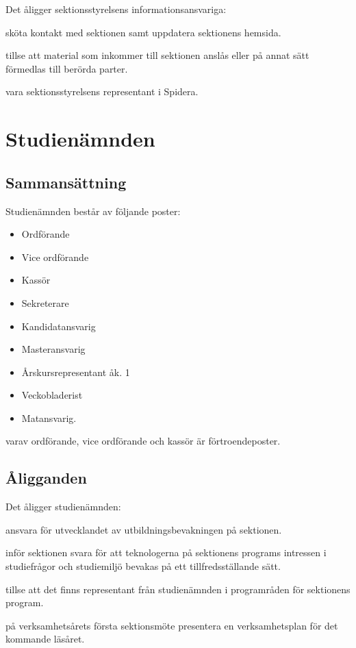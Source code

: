 \documentclass{styrdokument}
\begin{document}
\? Det åligger sektionsstyrelsens informationsansvariga:  
\begin{aligganden}
    \item sköta kontakt med sektionen samt uppdatera sektionens hemsida. 
    \item tillse att material som inkommer till sektionen anslås eller på annat sätt förmedlas till berörda parter.
    \item vara sektionsstyrelsens representant i Spidera.
\end{aligganden}    

\section{Studienämnden}
\subsection{Sammansättning}
\? Studienämnden består av följande poster:
\begin{itemize}
    \item Ordförande
	\item Vice ordförande
	\item Kassör
	\item Sekreterare
	\item Kandidatansvarig
	\item Masteransvarig
	\item Årskursrepresentant åk. 1
	\item Veckobladerist
	\item Matansvarig.
	\end{itemize}
varav ordförande, vice ordförande och kassör är förtroendeposter.

\subsection{Åligganden}
\? Det åligger studienämnden:
\begin{aligganden}
    \item ansvara för utvecklandet av utbildningsbevakningen på sektionen.
    \item inför sektionen svara för att teknologerna på sektionens programs intressen i studiefrågor och studiemiljö bevakas på ett tillfredsställande sätt.
    \item tillse att det finns representant från studienämnden i programråden för sektionens program.
    \item på verksamhetsårets första sektionsmöte presentera en verksamhetsplan för det kommande läsåret.
\end{aligganden}
\end{document}
